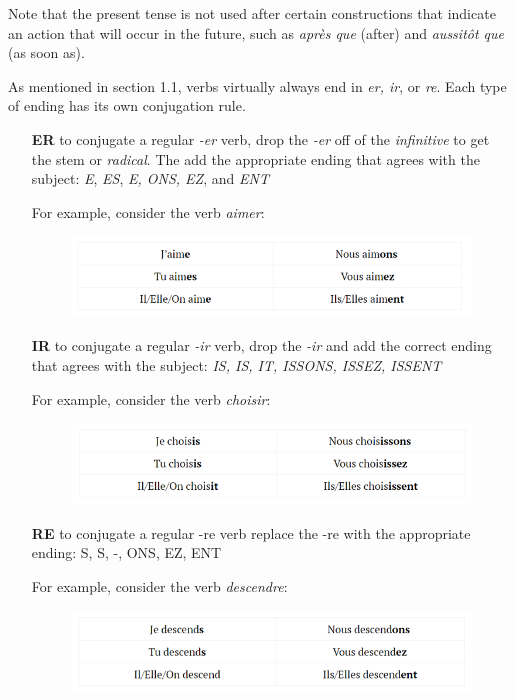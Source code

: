 \documentclass[11pt, oneside]{book}
\begin{document}
Note that the present tense is not used after certain constructions that indicate an action that will occur in the future, such as \textit{apr\`es que} (after) and \textit{aussit\^ot que} (as soon as).

As mentioned in section 1.1, verbs virtually always end in \textit{er, ir}, or \textit{re}. Each type of ending has its own conjugation rule.

\begin{enumerate}
	\item[\textbf{ER}] to conjugate a regular \textit{-er} verb, drop the \textit{-er} off of the \textit{infinitive} to get the stem or \textit{radical}. The add the appropriate ending that agrees with the subject: \textit{E}, \textit{ES}, \textit{E, ONS, EZ}, and \textit{ENT}
	
	For example, consider the verb \textit{aimer}:
	\begin{figure}[H]
	\includegraphics[scale=0.8]{charts/ERpresent.png}
	\end{figure}
	
	\item[\textbf{IR}] to conjugate a regular \textit{-ir} verb, drop the \textit{-ir} and add the correct ending that agrees with the subject: \textit{IS, IS, IT, ISSONS, ISSEZ, ISSENT}

	For example, consider the verb \textit{choisir}:
	\begin{figure}[H]
	\includegraphics[scale=0.8]{charts/IRpresent.png}
	\end{figure}
	
	\item[\textbf{RE}] to conjugate a regular -re verb replace the -re with the appropriate ending:
S, S, -, ONS, EZ, ENT

	For example, consider the verb \textit{descendre}:
	\begin{figure}[H]
	\includegraphics[scale=0.8]{charts/REpresent.png}
	\end{figure}
	
\end{enumerate}
\end{document}
